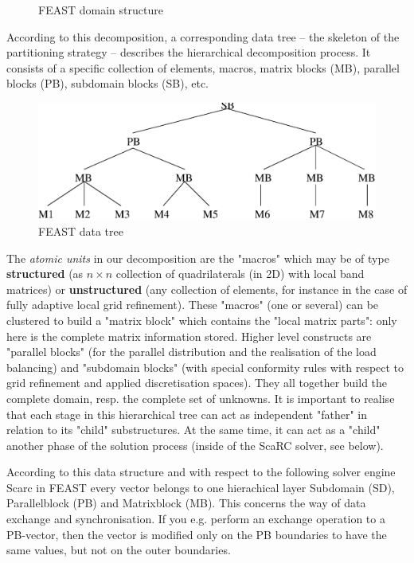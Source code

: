 \begin{figure}[htbp]
\begin{center}
\end{center}
\caption{FEAST domain structure}
\label{FIG_f1s}
\end{figure}

According to this decomposition, a corresponding data tree -- the skeleton of the partitioning strategy 
-- describes the hierarchical decomposition process. It consists of a specific collection of elements, 
macros, matrix blocks (MB), parallel blocks (PB), subdomain blocks (SB), etc.

\begin{figure}[htbp]
\begin{center}
\includegraphics[scale=0.4]{../psfiles/baum.eps}
\end{center}
\caption{FEAST data tree}
\label{FIG_f2s}
\end{figure}

The {\em atomic units} in our decomposition are the "macros" which may be of type {\bf structured} 
(as $n \times n$ collection of quadrilaterals (in 2D) with local band matrices) or 
{\bf unstructured} (any collection of elements, for instance in the case of fully adaptive local grid 
refinement). These "macros" (one or several) can be clustered to build a "matrix block" which 
contains the "local matrix parts": only here is the complete matrix information stored.
Higher level constructs are "parallel blocks" (for the parallel distribution and the realisation of the load balancing) and "subdomain blocks" 
(with special conformity rules with respect to grid refinement and applied discretisation spaces). 
They all together build the complete domain, resp. the complete set of unknowns. It is important to realise 
that each stage in this hierarchical tree can act as independent "father" in relation to its 
"child" substructures. At the same time, it can act as a "child" another phase of the solution 
process (inside of the {\sc ScaRC} solver, see below).

According to this data structure and with respect to the following solver engine
Scarc in FEAST every vector belongs to one hierachical layer Subdomain (SD), Parallelblock (PB) 
and Matrixblock (MB). This concerns the way of data exchange and synchronisation.
If you e.g. perform an exchange operation to a PB-vector, then the vector is modified only
on the PB boundaries to have the same values, but not on the outer boundaries.

